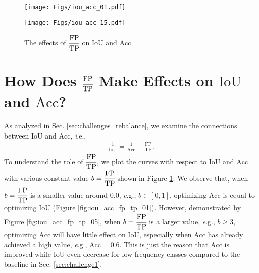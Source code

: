 \documentclass[final]{cvpr}
\begin{document}
\newpage
\begin{figure*}[h]
	\begin{center}
		\begin{minipage}[t]{0.48\textwidth} 
			\begin{center}
				\texttt{[image: Figs/iou\_acc\_01.pdf]} 
				\label{fig:iou_acc_fp_tp_01} 
			\end{center} 
		\end{minipage} 
		\hspace{0.05in}
		\begin{minipage}[t]{0.48\textwidth} 
			\begin{center}
				\texttt{[image: Figs/iou\_acc\_15.pdf]} 
				\label{fig:iou_acc_fp_tp_05} 
			\end{center}
		\end{minipage}
	\end{center}
	\caption{The effects of $\cfrac{\mathrm{FP}}{\mathrm{TP}}$ on $\mathrm{IoU}$ and $\mathrm{Acc}$.}
	\label{fig:iou_acc_fp_tp}
\end{figure*}


\section{How Does $\cfrac{\mathrm{FP}}{\mathrm{TP}}$ Make Effects on $\mathrm{IoU}$ and $\mathrm{Acc}$?}
\noindent As analyzed in Sec. \ref{sec:challenges_rebalance}, we examine the connections between $\mathrm{IoU}$ and $\mathrm{Acc}$, {\textit i.e.},
\begin{eqnarray}
\frac{1}{\mathrm{IoU}} = \frac{1}{\mathrm{Acc}} + \frac{\mathrm{FP}}{\mathrm{TP}}.
\end{eqnarray}
To understand the role of $\cfrac{\mathrm{FP}}{\mathrm{TP}}$, we plot the curves with respect to $\mathrm{IoU}$ and $\mathrm{Acc}$ with various constant value $b=\cfrac{\mathrm{FP}}{\mathrm{TP}}$ shown in Figure \ref{fig:iou_acc_fp_tp}. We observe that, when $b=\cfrac{\mathrm{FP}}{\mathrm{TP}}$ is a smaller value around 0.0, {\textit e.g.}, $b \in [0,1]$, optimizing $\mathrm{Acc}$ is equal to optimizing $\mathrm{IoU}$ (Figure \ref{fig:iou_acc_fp_tp_01}). However, demonstrated by Figure \ref{fig:iou_acc_fp_tp_05}, when $b=\cfrac{\mathrm{FP}}{\mathrm{TP}}$ is a larger value, {\textit e.g.}, $b \ge 3$, optimizing $\mathrm{Acc}$ will have little effect on $\mathrm{IoU}$, especially when $\mathrm{Acc}$ has already achieved a high value, {\textit e.g.}, $\mathrm{Acc}=0.6$. This is just the reason that $\mathrm{Acc}$ is improved while $\mathrm{IoU}$ even decrease for low-frequency classes compared to the baseline in Sec. \ref{sec:challenge1}.
\end{document}
